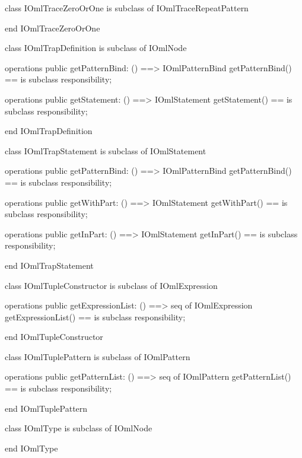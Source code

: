 \begin{vdm_al}
class IOmlTraceZeroOrOne
 is subclass of IOmlTraceRepeatPattern

end IOmlTraceZeroOrOne
\end{vdm_al}

\begin{vdm_al}
class IOmlTrapDefinition
 is subclass of IOmlNode

operations
  public getPatternBind: () ==> IOmlPatternBind
  getPatternBind() == is subclass responsibility;

operations
  public getStatement: () ==> IOmlStatement
  getStatement() == is subclass responsibility;

end IOmlTrapDefinition
\end{vdm_al}

\begin{vdm_al}
class IOmlTrapStatement
 is subclass of IOmlStatement

operations
  public getPatternBind: () ==> IOmlPatternBind
  getPatternBind() == is subclass responsibility;

operations
  public getWithPart: () ==> IOmlStatement
  getWithPart() == is subclass responsibility;

operations
  public getInPart: () ==> IOmlStatement
  getInPart() == is subclass responsibility;

end IOmlTrapStatement
\end{vdm_al}

\begin{vdm_al}
class IOmlTupleConstructor
 is subclass of IOmlExpression

operations
  public getExpressionList: () ==> seq of IOmlExpression
  getExpressionList() == is subclass responsibility;

end IOmlTupleConstructor
\end{vdm_al}

\begin{vdm_al}
class IOmlTuplePattern
 is subclass of IOmlPattern

operations
  public getPatternList: () ==> seq of IOmlPattern
  getPatternList() == is subclass responsibility;

end IOmlTuplePattern
\end{vdm_al}

\begin{vdm_al}
class IOmlType
 is subclass of IOmlNode

end IOmlType
\end{vdm_al}

